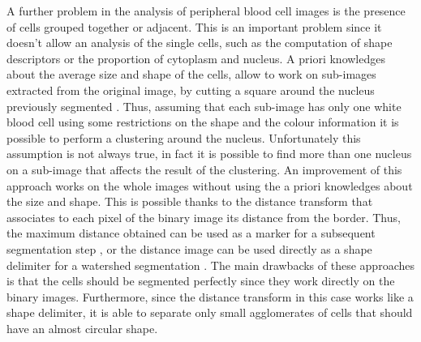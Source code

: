 \documentclass[final,a4paper,12pt,english]{UnicaPhdThesis3}
\begin{document}
A further problem in the analysis of peripheral blood cell images is the presence of cells grouped together or adjacent. This is an important problem since it doesn't allow an analysis of the single cells, such as the computation of shape descriptors or the proportion of cytoplasm and nucleus. A priori knowledges about the average size and shape of the cells, allow to work on sub-images extracted from the original image, by cutting a square around the nucleus previously segmented \cite{Kovalev, Sinha}. Thus, assuming that each sub-image has only one white blood cell using some restrictions on the shape and the colour information it is possible to perform a clustering around the nucleus. Unfortunately this assumption is not always true, in fact it is possible to find more than one nucleus on a sub-image that affects the result of the clustering. An improvement of this approach works on the whole images without using the a priori knowledges about the size and shape. This is possible thanks to the distance transform \cite{Maurer} that associates to each pixel of the binary image its distance from the border. Thus, the maximum distance obtained can be used as a marker for a subsequent segmentation step \cite{Malpica}, or the distance image can be used directly as a shape delimiter for a watershed segmentation \cite{Lindblad}. The main drawbacks of these approaches is that the cells should be segmented perfectly since they work directly on the binary images. Furthermore, since the distance transform in this case works like a shape delimiter, it is able to separate only small agglomerates of cells that should have an almost circular shape.
\end{document}

